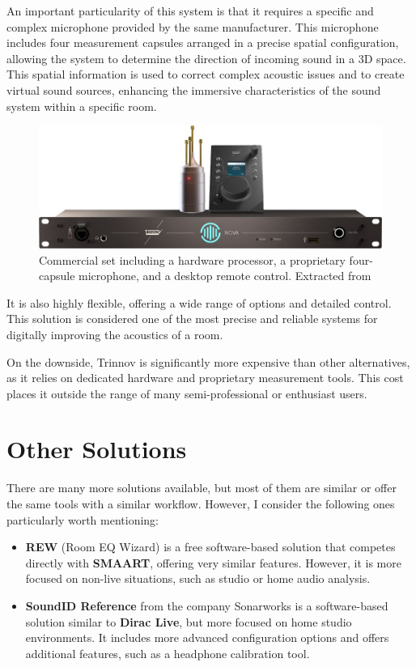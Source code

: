 An important particularity of this system is that it requires a specific and complex microphone provided by the same manufacturer. This microphone includes four measurement capsules arranged in a precise spatial configuration, allowing the system to determine the direction of incoming sound in a 3D space. This spatial information is used to correct complex acoustic issues and to create virtual sound sources, enhancing the immersive characteristics of the sound system within a specific room.

\begin{figure}[H]
	\centering
	\includegraphics[width=0.9
	\linewidth]{Figures/trinnov_set.jpg}
	\caption[Trinnov commercial set]{Commercial set including a hardware processor, a proprietary four-capsule microphone, and a desktop remote control. Extracted from \cite{trinnov_image2}}
	\label{fig:trinnov_hard}
\end{figure}

It is also highly flexible, offering a wide range of options and detailed control. This solution is considered one of the most precise and reliable systems for digitally improving the acoustics of a room.

On the downside, Trinnov is significantly more expensive than other alternatives, as it relies on dedicated hardware and proprietary measurement tools. This cost places it outside the range of many semi-professional or enthusiast users.


\section{Other Solutions}

There are many more solutions available, but most of them are similar or offer the same tools with a similar workflow. However, I consider the following ones particularly worth mentioning:

\begin{itemize}
	\item \textbf{REW} (Room EQ Wizard)\cite{rew} is a free software-based solution that competes directly with \textbf{SMAART}, offering very similar features. However, it is more focused on non-live situations, such as studio or home audio analysis.

	\item \textbf{SoundID Reference} from the company Sonarworks \cite{soundID} is a software-based solution similar to \textbf{Dirac Live}, but more focused on home studio environments. It includes more advanced configuration options and offers additional features, such as a headphone calibration tool.
	
\end{itemize}


